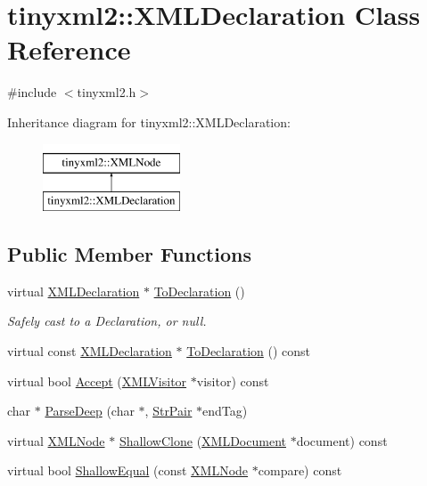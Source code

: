 \hypertarget{classtinyxml2_1_1_x_m_l_declaration}{\section{tinyxml2\+:\+:X\+M\+L\+Declaration Class Reference}
\label{classtinyxml2_1_1_x_m_l_declaration}
}


{\ttfamily \#include $<$tinyxml2.\+h$>$}

Inheritance diagram for tinyxml2\+:\+:X\+M\+L\+Declaration\+:\begin{figure}[H]
\begin{center}
\leavevmode
\includegraphics[height=2.000000cm]{classtinyxml2_1_1_x_m_l_declaration}
\end{center}
\end{figure}
\subsection*{Public Member Functions}
\begin{DoxyCompactItemize}
\item 
virtual \hyperlink{classtinyxml2_1_1_x_m_l_declaration}{X\+M\+L\+Declaration} $\ast$ \hyperlink{classtinyxml2_1_1_x_m_l_declaration_a159d8ac45865215e88059ea1e5b52fc5}{To\+Declaration} ()
\begin{DoxyCompactList}\small\item\em Safely cast to a Declaration, or null. \end{DoxyCompactList}\item 
virtual const \hyperlink{classtinyxml2_1_1_x_m_l_declaration}{X\+M\+L\+Declaration} $\ast$ \hyperlink{classtinyxml2_1_1_x_m_l_declaration_af724607a5fa810496fd6a21f5975a643}{To\+Declaration} () const 
\item 
virtual bool \hyperlink{classtinyxml2_1_1_x_m_l_declaration_a953a7359cc312d15218eb5843a4ca108}{Accept} (\hyperlink{classtinyxml2_1_1_x_m_l_visitor}{X\+M\+L\+Visitor} $\ast$visitor) const 
\item 
char $\ast$ \hyperlink{classtinyxml2_1_1_x_m_l_declaration_a19e33e0a9f9500f449261558c36f9a44}{Parse\+Deep} (char $\ast$, \hyperlink{classtinyxml2_1_1_str_pair}{Str\+Pair} $\ast$end\+Tag)
\item 
virtual \hyperlink{classtinyxml2_1_1_x_m_l_node}{X\+M\+L\+Node} $\ast$ \hyperlink{classtinyxml2_1_1_x_m_l_declaration_a39458732ee6796cfc85dd35d3c488e0b}{Shallow\+Clone} (\hyperlink{classtinyxml2_1_1_x_m_l_document}{X\+M\+L\+Document} $\ast$document) const 
\item 
virtual bool \hyperlink{classtinyxml2_1_1_x_m_l_declaration_ace0d2d9bc1b63278bd5e984ebe0c7bd0}{Shallow\+Equal} (const \hyperlink{classtinyxml2_1_1_x_m_l_node}{X\+M\+L\+Node} $\ast$compare) const 
\end{DoxyCompactItemize}
